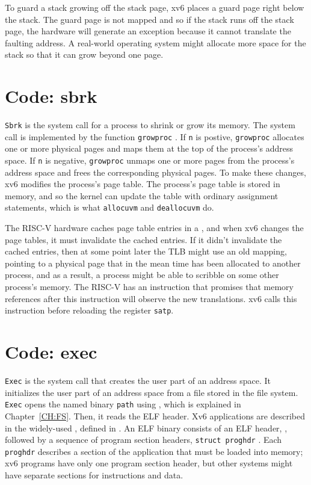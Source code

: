 To guard a stack growing off the stack page, xv6 places a guard page
right below the stack.  The guard page is not mapped and so if the
stack runs off the stack page, the hardware will generate an exception
because it cannot translate the faulting address.  A real-world
operating system might allocate more space for the stack so that it
can grow beyond one page.

\section{Code: sbrk}

\lstinline{Sbrk}
is the system call for a process to shrink or grow its memory. The system
call is implemented by the function
\lstinline{growproc}
.
If
\lstinline{n}
is postive,
\lstinline{growproc}
allocates one or more physical pages and maps them at the top of the process's
address space.  If
\lstinline{n}
is negative,
\lstinline{growproc}
unmaps one or more pages from the process's address space and frees the corresponding
physical pages.
To make these changes,
xv6 modifies the process's page table.  The process's page table is stored in
memory, and so the kernel can update the table with ordinary assignment
statements, which is what
\lstinline{allocuvm}
and
\lstinline{deallocuvm}
do.

The RISC-V hardware caches page table entries in a
, and when xv6 changes
the page tables, it must invalidate the cached entries.  If it didn't
invalidate the cached entries, then at some point later the TLB might
use an old mapping, pointing to a physical page that in the mean time
has been allocated to another process, and as a result, a process
might be able to scribble on some other process's memory.  The RISC-V
has an instruction  that promises that memory
references after this instruction will observe the new translations.
xv6 calls this instruction before reloading the register
\texttt{satp}.

\section{Code: exec}
\lstinline{Exec}
is the system call that creates the user part of an address space.  It
initializes the user part of an address space from a file stored in the file
system.
\lstinline{Exec}
opens the named binary
\lstinline{path}
using
,
which is explained in Chapter~\ref{CH:FS}.
Then, it reads the ELF header. Xv6 applications are described in the widely-used
,
defined in
.
An ELF binary consists of an ELF header,
,
followed by a sequence of program section headers,
\lstinline{struct proghdr}
.
Each
\lstinline{proghdr}
describes a section of the application that must be loaded into memory;
xv6 programs have only one program section header, but
other systems might have separate sections
for instructions and data.

